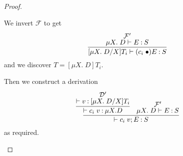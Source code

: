 \documentclass[11pt]{article}
\begin{document}
\begin{enumerate}
\begin{proof}
\begin{description}
          We invert $\mathcal{F}$ to get
          \begin{equation*}
            \infer{
              [\mu X.\; D/X]T_i \proves (c_i\;\bullet)E \hastype S
            }{
              \deduce[\mathcal{F}^\prime]{\mu X.\; D \proves E \hastype S}{}
            }
          \end{equation*}
          and we discover $T = [\mu X.\; D]T_i$.

          Then we construct a derivation
          \begin{equation*}
            \infer{
              \proves c_i\; v ; E \hastype S
            }{
              \infer{
                \proves c_i\; v \hastype \mu X. D
              }{
                \deduce[\mathcal{D}^\prime]{
                  \proves v \hastype [\mu X.\; D/X]T_i
                }{}
              }
              &
              \deduce[\mathcal{F}^\prime]{
                \mu X.\; D \proves E \hastype S
              }{}
            }
          \end{equation*}
          as required.
      \end{description}

    \end{proof}
\end{enumerate}

\end{document}

